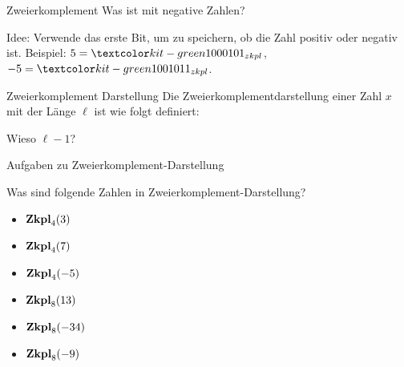 \documentclass[handout]{beamer}
\begin{document}
\begin{frame}{Zweierkomplement}
\p Was ist mit negative Zahlen?

\begin{itemize}
\pitem Idee: Verwende das erste Bit, um zu speichern, ob die Zahl positiv oder negativ ist.
\pitem Beispiel: \p $5 = \markGreen{0}101_{zkpl}$\p , $-5 = \markGreen{1}011_{zkpl}$.
\end{itemize}

\pause

\begin{block}{Zweierkomplement Darstellung}
Die Zweierkomplementdarstellung einer Zahl $x$ \p mit der Länge $\ell$ ist wie folgt definiert:\p
{}		
\end{block}

\begin{itemize}
\pitem Wieso $\ell - 1$?
\end{itemize}

\end{frame}

\begin{frame}{Aufgaben zu Zweierkomplement-Darstellung}

Was sind folgende Zahlen in Zweierkomplement-Darstellung?
\begin{itemize}
\item $\textbf{Zkpl}_4 (3)$ 
\item $\textbf{Zkpl}_4 (7)$ 
\item $\textbf{Zkpl}_4 (-5)$ 
\item $\textbf{Zkpl}_8 (13)$ 
\item $\textbf{Zkpl}_8 (-34)$ 
\item $\textbf{Zkpl}_8 (-9)$ 
\end{itemize}
\end{frame}
\end{document}
